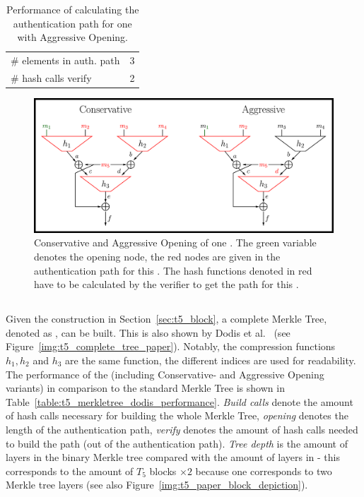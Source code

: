\begin{table}
\centering
\begin{tabular}{l c} 
 \hline\noalign{\smallskip}
 \multicolumn{2}{c}{\textbf{Aggressive Opening}} \\
 \hline\noalign{\smallskip}
 \# elements in auth. path & 3 \\
 \# hash calls verify & 2 \\
 \hline
\end{tabular}
\caption{Performance of calculating the authentication path for one \tfblock with Aggressive Opening.}
\label{table:aggr_opening}
\end{table}



\begin{figure}
\centering
\includegraphics[]{images/Methods/aggr_conserv_opening_T5.png}
\caption{Conservative and Aggressive Opening of one \tfblock. The green variable denotes the opening node, the red nodes are given in the authentication path for this \tfblock. The hash functions denoted in red have to be calculated by the verifier to get the path for this \tfblock.~\cite{T5_paper}}
\label{img:t5_conserv_aggr_opening}
\end{figure}

\subsection{\texorpdfstring{\tftree}{T5 Merkle Tree}}
\label{sec:dodis_t5_merkle_tree}
Given the \tfblock construction in Section~\ref{sec:t5_block}, a complete \tf Merkle Tree, denoted as \textit{\tftree}, can be built. This is also shown by Dodis et al.~\cite{T5_paper} (see Figure~\ref{img:t5_complete_tree_paper}). Notably, the compression functions $h_1, h_2$ and $h_3$ are the same function, the different indices are used for readability. The performance of the \tftree (including Conservative- and Aggressive Opening variants) in comparison to the standard Merkle Tree is shown in Table~\ref{table:t5_merkletree_dodis_performance}. \textit{Build calls} denote the amount of hash calls necessary for building the whole \tf Merkle Tree, \textit{opening} denotes the length of the authentication path, \textit{verify} denotes the amount of hash calls needed to build the path (out of the authentication path). \textit{Tree depth} is the amount of layers in the binary Merkle tree compared with the amount of layers in \tftree - this corresponds to the amount of $T_5$ blocks $\times 2$ because one \tfblock corresponds to two Merkle tree layers (see also Figure~\ref{img:t5_paper_block_depiction}).

